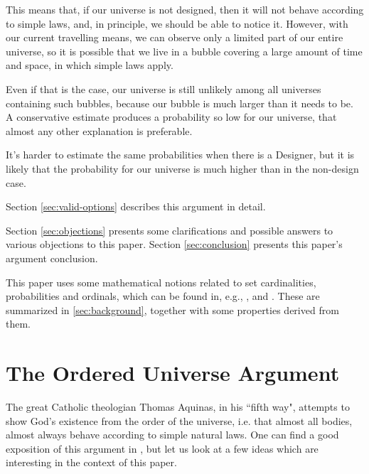 \documentclass[a4paper
,draft
]{article}
\newcommand{\paper}[1]{paper}
\newcommand{\ghilimele}[1]{``#1"}
\begin{document}
This means that, if our universe is not designed, then it will not behave
according to simple laws, and, in principle, we should be able to notice it.
However, with our current travelling means, we can observe only a limited
part of our entire universe, so it is possible that we live in a bubble covering
a large amount of time and space, in which simple laws apply.

Even if that is the case, our universe is still unlikely among all universes
containing such bubbles, because our bubble is much larger than it needs to
be.
A conservative estimate produces a probability so low for our universe,
that almost any other explanation is preferable.

It's harder to estimate the same probabilities when there is a Designer, but
it is likely that the probability for our universe is much higher than in the
non-design case.

Section \ref{sec:valid-options} describes this argument in detail.

Section \ref{sec:objections} presents some clarifications and possible
answers to various objections to this paper.
Section \ref{sec:conclusion} presents this \paper{}'s argument conclusion.

This \paper{} uses some mathematical notions related to set cardinalities,
probabilities and ordinals, which can be found in, e.g.,
\textcite{sep-set-theory}, \textcite{Cohen1966} and \textcite{Billingsley1995}.
These are summarized in \ref{sec:background}, together with some properties
derived from them.

\section{The Ordered Universe Argument}
\label{sec:ordered-universe}

The great Catholic theologian Thomas Aquinas,
in his \ghilimele{fifth way}, attempts to show God's existence from
the order of the universe, i.e. that almost all bodies, almost always
behave according to simple natural laws.
One can find a good exposition of this argument in
\parencite{swinburne1968}, but let us look at a few ideas which are
interesting in the context of this \paper{}.
\end{document}

